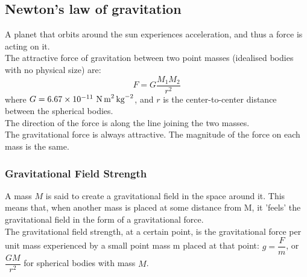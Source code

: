 \documentclass[a4paper,12pt]{article}
\begin{document}
\subsection{Newton's law of gravitation}
A planet that orbits around the sun experiences acceleration, and thus a force is acting on it.\\
The attractive force of gravitation between two point masses (idealised bodies with no physical size) are:
\[F=G\dfrac{M_1M_2}{r^2}\]
where $G=6.67\times 10^{-11}\ \text{N\,m}^{2}\,\text{kg}^{-2}$, and $r$ is the center-to-center distance between the spherical bodies.\\
The direction of the force is along the line joining the two masses.\\
The gravitational force is always attractive. The magnitude of the force on each mass is the same.
\subsubsection*{Gravitational Field Strength}
A mass $M$ is said to create a gravitational field in the space around it. This means that, when another mass is placed at some distance from M, it 'feels' the gravitational field in the form of a gravitational force.\\
The gravitational field strength, at a certain point, is the gravitational force per unit mass experienced by a small point mass m placed at that point: $g=\dfrac{F}{m}$, or $\dfrac{GM}{r^2}$ for spherical bodies with mass $M$.\\
\begin{center}
\end{center}
\end{document}
